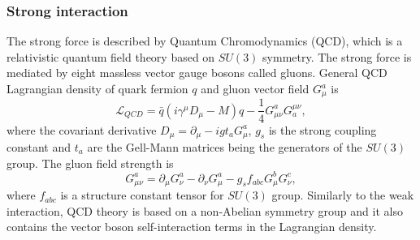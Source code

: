 \subsubsection{Strong interaction}
\label{sec:QCD_SM}
The strong force is described by Quantum Chromodynamics (QCD), which is a relativistic quantum field theory based on $SU(3)$ symmetry.
The strong force is mediated by eight massless vector gauge bosons called gluons. 
General QCD Lagrangian density of quark fermion $q$ and gluon vector field $G^a_\mu$ is
\begin{equation}
	\mathcal{L}_{QCD}=\bar{q}(i\gamma^\mu D_\mu - M ) q - \frac{1}{4}G^a_{\mu\nu}G^{\mu\nu}_a,
    \label{formula:strongLagrangian_1}
\end{equation}
where the covariant derivative $D_\mu = \partial_\mu - i g t_a G^a_\mu$, $g_s$ is the strong coupling constant and $t_a$ are the Gell-Mann matrices being the generators of the $SU(3)$ group. The gluon field strength is
\begin{equation}
G^a_{\mu\nu}=\partial_\mu G^a_\nu - \partial_\nu G^a_\mu - g_s f_{abc}G_\mu^b G_\nu^c,
\end{equation}
where $f_{abc}$ is a structure constant tensor for $SU(3)$ group. 
Similarly to the weak interaction, QCD theory is based on a non-Abelian symmetry group and it also contains the vector boson self-interaction terms in the Lagrangian density. 

